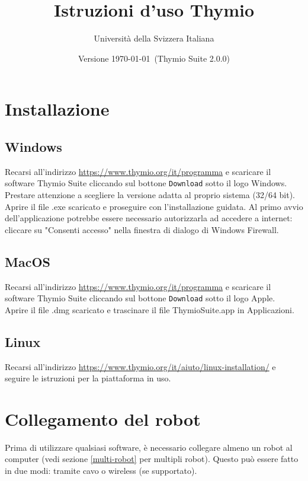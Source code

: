\documentclass[12pt]{article}
\title{Istruzioni d'uso Thymio}
\author{Università della Svizzera Italiana}
\date{Versione \today \ (Thymio Suite 2.0.0)}
\begin{document}
\maketitle
\tableofcontents
\newpage


\section{Installazione}\label{installation}

	\subsection{Windows}
	
		Recarsi all'indirizzo \url{https://www.thymio.org/it/programma} e scaricare il software Thymio Suite cliccando sul bottone \texttt{Download} sotto il logo Windows. Prestare attenzione a scegliere la versione adatta al proprio sistema (32/64 bit).\\
		Aprire il file .exe scaricato e proseguire con l'installazione guidata. Al primo avvio dell'applicazione potrebbe essere necessario autorizzarla ad accedere a internet: cliccare su "Consenti accesso" nella finestra di dialogo di Windows Firewall.
		
	\subsection{MacOS}
	
		Recarsi all'indirizzo \url{https://www.thymio.org/it/programma} e scaricare il software Thymio Suite cliccando sul bottone \texttt{Download} sotto il logo Apple.\\	
		Aprire il file .dmg scaricato e trascinare il file ThymioSuite.app in Applicazioni.
		
	\subsection{Linux}
	
		Recarsi all'indirizzo \url{https://www.thymio.org/it/aiuto/linux-installation/} e seguire le istruzioni per la piattaforma in uso.
			

\section{Collegamento del robot}

	Prima di utilizzare qualsiasi software, è necessario collegare almeno un robot al computer (vedi sezione \ref{multi-robot} per multipli robot). Questo può essere fatto in due modi: tramite cavo o wireless (se supportato).
	
\end{document}
